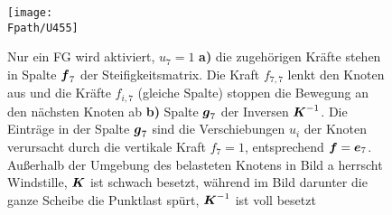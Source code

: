 {%
\begin{figure}
\centering
\if {} \sidecaption \fi
\texttt{[image: \\Fpath/U455]}
\caption{Nur ein FG wird aktiviert, $u_{7} = 1$ \textbf{ a)} die zugeh\"{o}rigen Kr\"{a}fte stehen in Spalte $\mbox{\boldmath $f$}_7$ der Steifigkeitsmatrix. Die Kraft $f_{7, 7}$ lenkt den Knoten aus und die Kr\"{a}fte $f_{i,7}$ (gleiche Spalte) stoppen die Bewegung an den n\"{a}chsten Knoten ab \textbf{ b)} Spalte $\mbox{\boldmath $g$}_7$ der Inversen $\mbox{\boldmath $K$}^{-1}$. Die Eintr\"{a}ge in der Spalte $\mbox{\boldmath $g$}_{7}$ sind die Verschiebungen $u_i$ der Knoten verursacht durch die vertikale Kraft $f_7 = 1$, entsprechend $\mbox{\boldmath $f$} = \mbox{\boldmath $e$}_7$. Au{\ss}erhalb der Umgebung des belasteten Knotens in Bild a herrscht \glq Windstille\grq{}, $\mbox{\boldmath $K$}$ ist schwach besetzt, w\"{a}hrend im Bild darunter die ganze Scheibe die Punktlast sp\"{u}rt, $\mbox{\boldmath $K$}^{-1}$ ist voll besetzt }
\label{U447}%
\end{figure}%

}
